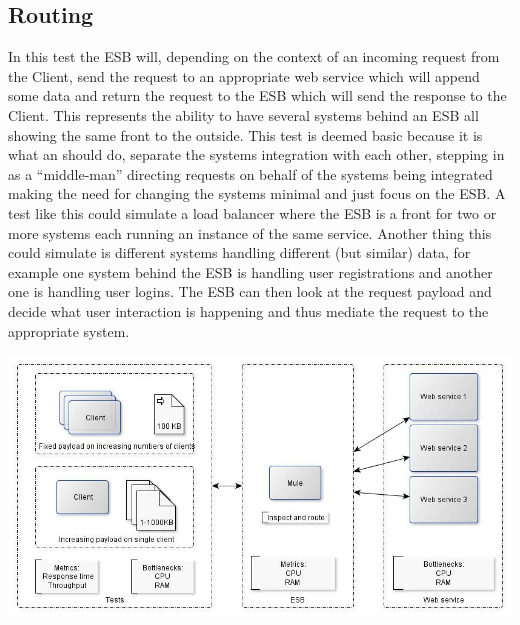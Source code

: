 \subsection{Routing}
In this test the ESB will, depending on the context of an incoming request from the Client, send the request to an appropriate web service which will append some data and return the request to the ESB which will send the response to the Client.
This represents the ability to have several systems behind an ESB all showing the same front to the outside.
This test is deemed basic because it is what an should do, separate the systems integration with each other, stepping in as a ``middle-man'' directing requests on behalf of the systems being integrated making the need for changing the systems minimal and just focus on the ESB. 
A test like this could simulate a load balancer where the ESB is a front for two or more systems each running an instance of the same service. Another thing this could simulate is different systems handling different (but similar) data, for example one system behind the ESB is handling user registrations and another one is handling user logins. The ESB can then look at the request payload and decide what user interaction is happening and thus mediate the request to the appropriate system.

\centerline{\includegraphics[scale=0.43]{img/Routing}}
